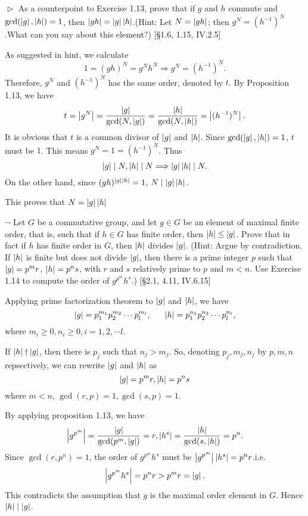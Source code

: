 \begin{problem}[1.14]
$\vartriangleright$ As a counterpoint to Exercise 1.13, prove that if $g$ and $h$ commute and
$\gcd(\left|g\right|, \left|h\right|)=1$, then $\left|gh\right|=\left|g\right|\left|h\right|$.(Hint: Let $N=\left|gh\right|$; then $g^N=(h^{-1})^{N}$.What
can you say about this element?) [\S 1.6, 1.15, IV.2.5]
\end{problem}

\begin{solution}
As suggested in hint, we calculate 
$$1 = (gh)^N = g^Nh^N\Longrightarrow g^N = (h^{-1})^N.$$
Therefore, $g^N$ and $(h^{-1})^{N}$ has the same order, denoted by $t$. By Proposition 1.13, we have
$$t = \left|g^N\right| = \frac{\left|g\right|}{\gcd(N, \left|g\right|)} = \frac{\left|h\right|}{\gcd(N, \left|h\right|)} = \left|(h^{-1})^N\right|.$$
It is obvious that $t$ is a common divisor of $\left|g\right|$ and $\left|h\right|$. Since $\gcd(\left|g\right|, \left|h\right|)=1$, $t$ must be $1$.
This means $g^N = 1 = (h^{-1})^N$. Thus
$$\left|g\right| \mid N, \left|h\right| \mid N\Longrightarrow \left|g\right|\left|h\right|\mid N.$$
On the other hand, since $(gh)^{\left|g\right|\left|h\right|} =1$, $N\mid\left|g\right|\left|h\right|$.

This proves that $N = \left|g\right|\left|h\right|$
\end{solution}

\begin{problem}[1.15]
$\neg$ Let $G$ be a commutative group, and let $g \in G$ be an element of maximal
finite order, that is, such that if $h \in G$ has finite order, then $\left|h\right| \leq \left|g\right|$. 
Prove that in fact if $h$ has finite order in $G$, then $\left|h\right|$ divides $\left|g\right|$. (Hint: 
Argue by contradiction. If $\left|h\right|$ is finite but does not divide $\left|g\right|$, 
then there is a prime integer $p$ such that $\left|g\right|=p^mr$, $\left|h\right|=p^ns$, with $r$ and $s$ relatively 
prime to $p$ and $m < n$. Use Exercise 1.14 to compute the order of $g^{p^m}h^s$.) [\S 2.1, 4.11, IV.6.15]
\end{problem}

\begin{solution}
Applying prime factorization theorem to $\left|g\right|$ and $\left|h\right|$, we have
$$\abs{g} = p_1^{m_1}p_2^{m_2}\cdots p_l^{m_l}, \indent \abs{h} = p_1^{n_1}p_2^{n_2}\cdots p_l^{n_l},$$
where $m_i \geq 0, n_i \geq 0, i = 1, 2,\cdots l$.

If $\left|h\right|\nmid\left|g\right|$, then there is $p_j$ such that $n_j > m_j$. So, denoting $p_j, m_j, n_j$ by $p,m,n$ repsectively, 
we can rewrite 
$\left|g\right|$ and $\left|h\right|$ as
$$\left|g\right| = p^{m}r, \left|h\right| = p^ns$$
where $m < n$, $\gcd(r,p)=1, \gcd(s,p) = 1$.

By applying proposition 1.13, we have
$$\left|g^{p^m}\right| = \frac{\left|g\right|}{\gcd(p^m, \left|g\right|)} = r, \left|h^s\right| = \frac{\left|h\right|}{\gcd(s,\left|h\right|)} = p^n.$$
Since $\gcd(r, p^n) = 1$, the order of $g^{p^m}h^s$ must be $\left|g^{p^m}\right|\left|h^s\right| = p^nr$.i.e.
$$\left|g^{p^m}h^s\right| = p^nr > p^mr=\left|g\right|.$$
This contradicts the assumption that $g$ is the maximal order element in $G$. Hence $\left|h\right|\mid\left|g\right|$.
\end{solution}
